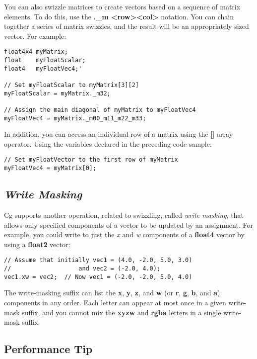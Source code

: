 \documentclass[../main.tex]{subfiles}
\begin{document}
You can also swizzle matrices to create vectors based on a sequence of matrix elements. To do this, use the \textbf{._m <row><col>} notation. You can chain together a series of matrix swizzles, and the result will be an appropriately sized vector. For example:

\FloatBarrier
\begin{lstlisting}
float4x4 myMatrix;
float    myFloatScalar;
float4   myFloatVec4;'

// Set myFloatScalar to myMatrix[3][2]
myFloatScalar = myMatrix._m32;

// Assign the main diagonal of myMatrix to myFloatVec4
myFloatVec4 = myMatrix._m00_m11_m22_m33;
\end{lstlisting}
\FloatBarrier

In addition, you can access an individual row of a matrix using the \textbf{[}] array operator. Using the variables declared in the preceding code sample:

\FloatBarrier
\begin{lstlisting}
// Set myFloatVector to the first row of myMatrix
myFloatVec4 = myMatrix[0];
\end{lstlisting}
\FloatBarrier

\subsection*{\textit{Write Masking}}

Cg supports another operation, related to swizzling, called \textit{write masking}, that allows only specified components of a vector to be updated by an assignment. For example, you could write to just the \textit{x} and \textit{w} components of a \textbf{float4} vector by using a \textbf{float2} vector:

\FloatBarrier
\begin{lstlisting}
// Assume that initially vec1 = (4.0, -2.0, 5.0, 3.0)
//                   and vec2 = (-2.0, 4.0);
vec1.xw = vec2;  // Now vec1 = (-2.0, -2.0, 5.0, 4.0)
\end{lstlisting}
\FloatBarrier

The write-masking suffix can list the \textbf{x}, \textbf{y}, \textbf{z}, and \textbf{w} (or \textbf{r}, \textbf{g}, \textbf{b}, and \textbf{a}) components in any order. Each letter can appear at most once in a given write-mask suffix, and you cannot mix the \textbf{xyzw} and \textbf{rgba} letters in a single write-mask suffix.

\subsection*{Performance Tip}
\end{document}
